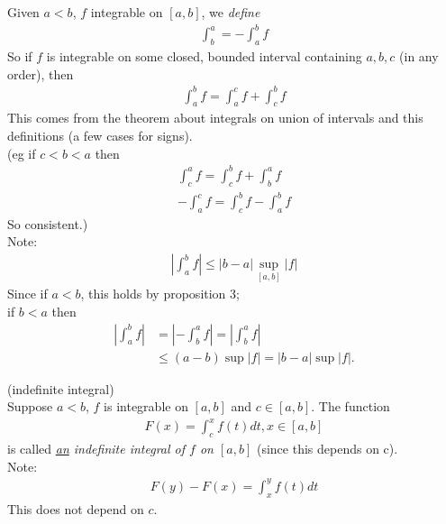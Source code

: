 \documentclass[a4paper]{article}
\begin{document}
\begin{defi}
Given $a<b$, $f$ integrable on $\left[a,b\right]$, we \emph{define}
\begin{equation*}
\begin{aligned}
\int_b^a = -\int_a^b f
\end{aligned}
\end{equation*}
So if $f$ is integrable on some closed, bounded interval containing $a,b,c$ (in any order), then
\begin{equation*}
\begin{aligned}
\int_a^b f = \int_a^c f + \int_c^b f
\end{aligned}
\end{equation*}
This comes from the theorem about integrals on union of intervals and this definitions (a few cases for signs).\\
(eg if $c<b<a$ then
\begin{equation*}
\begin{aligned}
\int_c^a f = \int_c^b f + \int_b^a f\\
-\int_a^c f = \int_c^b f - \int_a^b f
\end{aligned}
\end{equation*}
So consistent.)\\
Note:
\begin{equation*}
\begin{aligned}
|\int_a^b f| \leq |b-a| \sup_{\left[a,b\right]} |f|
\end{aligned}
\end{equation*}
Since if $a<b$, this holds by proposition 3;\\
if $b<a$ then
\begin{equation*}
\begin{aligned}
|\int_a^b f| &= |-\int_b^a f| = |\int_b^a f|\\
&\leq \left(a-b\right) \sup |f| = |b-a| \sup |f|.
\end{aligned}
\end{equation*}
\end{defi}

\begin{defi} (indefinite integral)\\
Suppose $a<b$, $f$ is integrable on $\left[a,b\right]$ and $c\in \left[a,b\right]$. The function
\begin{equation*}
\begin{aligned}
F\left(x\right) = \int_c^x f\left(t\right)dt, x\in\left[a,b\right]
\end{aligned}
\end{equation*}
is called \emph{\underline{an} indefinite integral of $f$ on $\left[a,b\right]$} (since this depends on c).\\
Note:
\begin{equation*}
\begin{aligned}
F\left(y\right) - F\left(x\right) = \int_x^y f\left(t\right) dt
\end{aligned}
\end{equation*}
This does not depend on $c$.
\end{defi}
\end{document}
